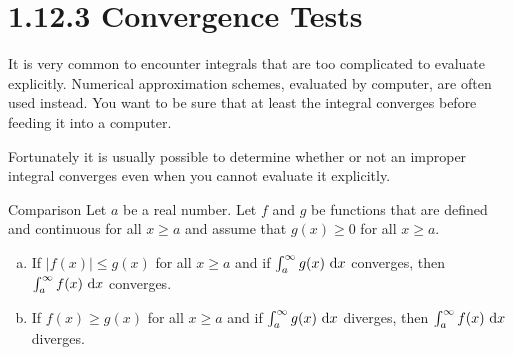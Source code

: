 \section{1.12.3 Convergence Tests}
\begin{frame}
It is very common to encounter integrals that are too complicated to evaluate explicitly.
Numerical approximation schemes, evaluated by computer, are often used instead. You want to be sure that at least the integral converges before feeding it into a computer. \vfill

Fortunately it is usually possible to determine whether or not an improper
integral converges even when you cannot evaluate it explicitly.
\end{frame}
\begin{frame}[t]
\label{note1.12a}

\begin{block}{Comparison}
Let $a$ be a real number. Let $f$ and $g$ be functions that are defined and continuous for all $x \ge a$ and assume that $g(x) \ge 0$ for all $x \ge a$.
\begin{enumerate}[(a)]
\item If $|f(x)| \le g(x)$ for all $x \ge a$ and if $\int_a^\infty g(x) \ \text{d} x$ converges, then $\int_a^\infty f(x) \ \text{d} x$ converges.
\item If $f(x) \ge g(x)$ for all $x \ge a$ and if $\int_a^\infty g(x) \ \text{d} x$ diverges, then $\int_a^\infty f(x) \ \text{d} x$ diverges.
\end{enumerate}
\end{block}

\end{frame}

